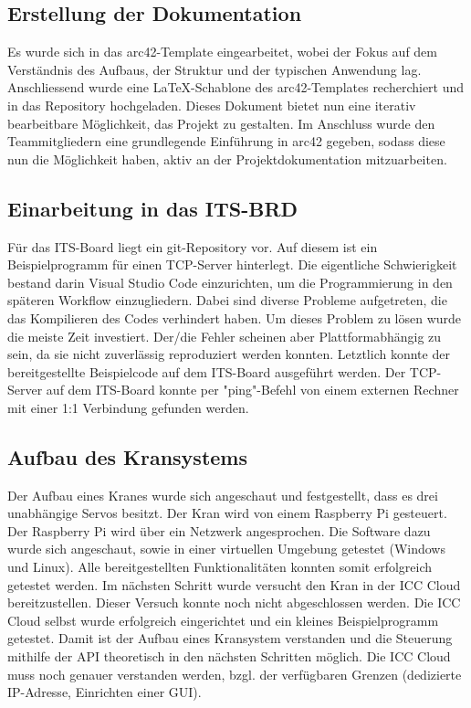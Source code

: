 \documentclass{article}
\begin{document}
\subsection{Erstellung der Dokumentation}
Es wurde sich in das arc42-Template eingearbeitet, wobei der Fokus auf dem Verständnis des Aufbaus, der Struktur und der typischen Anwendung lag. Anschliessend wurde eine LaTeX-Schablone des arc42-Templates recherchiert und in das Repository hochgeladen. Dieses Dokument bietet nun eine iterativ bearbeitbare Möglichkeit, das Projekt zu gestalten.
Im Anschluss wurde den Teammitgliedern eine grundlegende Einführung in arc42 gegeben, sodass diese nun die Möglichkeit haben, aktiv an der Projektdokumentation mitzuarbeiten.

\subsection{Einarbeitung in das ITS-BRD}
Für das ITS-Board liegt ein git-Repository vor. Auf diesem ist ein Beispielprogramm für einen TCP-Server hinterlegt. Die eigentliche Schwierigkeit bestand darin Visual Studio Code einzurichten, um die Programmierung in den späteren Workflow einzugliedern. Dabei sind diverse Probleme aufgetreten, die das Kompilieren des Codes verhindert haben. Um dieses Problem zu lösen wurde die meiste Zeit investiert. Der/die Fehler scheinen aber Plattformabhängig zu sein, da sie nicht zuverlässig reproduziert werden konnten. Letztlich konnte der bereitgestellte Beispielcode auf dem ITS-Board ausgeführt werden. Der TCP-Server auf dem ITS-Board konnte per "ping"-Befehl von einem externen Rechner mit einer 1:1 Verbindung gefunden werden.
\subsection{Aufbau des Kransystems}
Der Aufbau eines Kranes wurde sich angeschaut und festgestellt, dass es drei unabhängige Servos besitzt. Der Kran wird von einem Raspberry Pi gesteuert. Der Raspberry Pi wird über ein Netzwerk angesprochen. Die Software dazu wurde sich angeschaut, sowie in einer virtuellen Umgebung getestet (Windows und Linux). Alle bereitgestellten Funktionalitäten konnten somit erfolgreich getestet werden. Im nächsten Schritt wurde versucht den Kran in der ICC Cloud bereitzustellen. Dieser Versuch konnte noch nicht abgeschlossen werden. Die ICC Cloud selbst wurde erfolgreich eingerichtet und ein kleines Beispielprogramm getestet. Damit ist der Aufbau eines Kransystem verstanden und die Steuerung mithilfe der API theoretisch in den nächsten Schritten möglich. Die ICC Cloud muss noch genauer verstanden werden, bzgl. der verfügbaren Grenzen (dedizierte IP-Adresse, Einrichten einer GUI).
\end{document}
